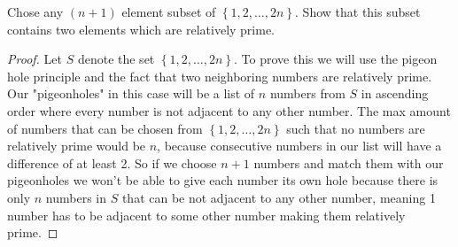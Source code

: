\documentclass[11pt]{article}
\newenvironment{problem}[2][Problem\!]{\begin{trivlist}
\item[\hskip \labelsep {\bfseries #1}\hskip \labelsep {\bfseries #2}]}{\end{trivlist}}
\newcommand{\set}[1]{\left\{#1\right\}} %
\begin{document}
\newpage
\begin{tcolorbox}
    \begin{problem}{10/8 | OC | 30. }
        Chose any $(n+1)$ element subset of $\set{1,2,\dots, 2n}$. Show that this subset contains two elements which are relatively prime. 
    \end{problem}
\end{tcolorbox}
\begin{proof}
    Let $S$ denote the set $\set{1,2,\dots,2n}$. To prove this we will use the pigeon hole principle and the fact that two neighboring numbers are relatively prime. Our "pigeonholes" in this case will be a list of $n$ numbers from $S$ in ascending order where every number is not adjacent to any other number.  The max amount of numbers that can be chosen from $\set{1,2, \dots , 2n}$ such that no numbers are relatively prime would be $n$, because consecutive numbers in our list will have a difference of at least 2. So if we choose $n+1$ numbers and match them with our pigeonholes we won't be able to give each number its own hole because there is only $n$ numbers in $S$ that can be not adjacent to any other number, meaning 1 number has to be adjacent to some other number making them relatively prime. 
\end{proof}
\end{document}
